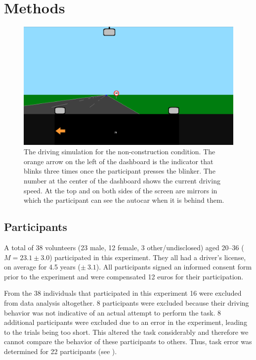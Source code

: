 
\section{Methods}\label{sec:methods}
\begin{figure}[tp]
  \centering
  \includegraphics[width=\textwidth]{images/screenshot_noncon_blinker.pdf}
  \caption{The driving simulation for the non-construction condition.
  The orange arrow on the left of the dashboard is the indicator that blinks three times once the participant presses the blinker.
  The number at the center of the dashboard shows the current driving speed. 
  At the top and on both sides of the screen are mirrors in which the participant can see the autocar when it is behind them.}
  \label{fig:screenshot_noncon}
\end{figure}

\subsection{Participants}
A total of 38 volunteers (23 male, 12 female, 3 other/undisclosed) aged 20--36 (\(M = 23.1 \pm 3.0\)) participated in this experiment. 
They all had a driver's license, on average for 4.5 years (\(\pm\ 3.1\)).
All participants signed an informed consent form prior to the experiment and were compensated 12 euros for their participation.

From the 38 individuals that participated in this experiment 16 were excluded from data analysis altogether.
8 participants were excluded because their driving behavior was not indicative of an actual attempt to perform the task.
8 additional participants were excluded due to an error in the experiment, leading to the trials being too short.
This altered the task considerably and therefore we cannot compare the behavior of these participants to others.
Thus, task error was determined for 22 participants (see \citealp{DeMooij2021}). 

